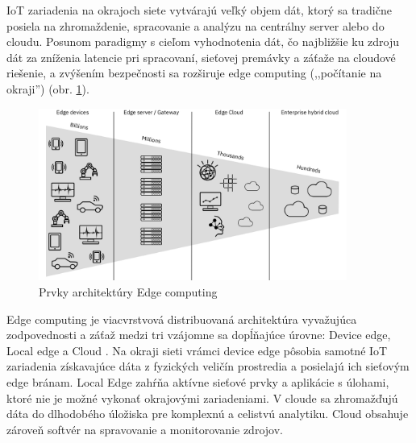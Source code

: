 IoT zariadenia na okrajoch siete vytvárajú veľký objem dát, ktorý sa tradične posiela na zhromaždenie, spracovanie
a analýzu na centrálny server alebo do cloudu. Posunom paradigmy s cieľom vyhodnotenia dát, čo najbližšie
ku zdroju dát za zníženia latencie pri spracovaní, sieťovej premávky a záťaže na cloudové riešenie, a zvýšením
bezpečnosti sa rozširuje edge computing (,,počítanie na okraji'') (obr. \ref{fig:edge-computing}).
\begin{figure}[h]
	\centering
	\includegraphics[width=0.9\textwidth]{figures/analysis/edge-computing.png}
	\caption{Prvky architektúry Edge computing \cite{ibm-edge-architecture}}
	\label{fig:edge-computing}
\end{figure}

Edge computing je viacvrstvová distribuovaná architektúra vyvažujúca zodpovednosti a záťaž medzi
tri vzájomne sa dopĺňajúce úrovne: Device edge, Local edge a Cloud \cite{edge-computing-survey}. Na okraji sieti
vrámci device edge pôsobia  samotné IoT zariadenia získavajúce dáta z fyzických veličín prostredia a posielajú ich
sieťovým edge bránam. Local Edge zahŕňa aktívne sieťové prvky a aplikácie s úlohami, ktoré nie je možné vykonať
okrajovými zariadeniami. V cloude sa zhromažďujú dáta do dlhodobého úložiska pre komplexnú a celistvú analytiku.
Cloud obsahuje zároveň softvér na spravovanie a monitorovanie zdrojov.
